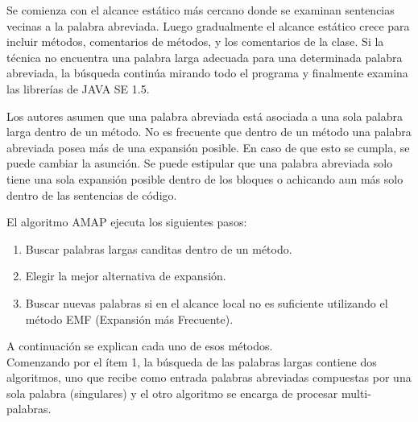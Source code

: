 \documentclass[a4paper,12pt]{report}
\begin{document}
Se comienza con el alcance estático más cercano donde se examinan sentencias vecinas a la palabra abreviada. Luego gradualmente el alcance estático crece para incluir métodos, comentarios de métodos, y los comentarios de la clase. Si la técnica no encuentra una palabra larga adecuada para una determinada palabra abreviada, la búsqueda continúa mirando todo el programa y finalmente examina las librerías de JAVA SE 1.5. 

Los autores asumen que una palabra abreviada está asociada a una sola palabra larga dentro de un método. No es frecuente que dentro de un método una palabra abreviada posea más de una expansión posible. En caso de que esto se cumpla, se puede cambiar la asunción. Se puede estipular que una palabra abreviada solo tiene una sola expansión posible dentro de los bloques o achicando aun más solo dentro de las sentencias de código.


El algoritmo AMAP ejecuta los siguientes pasos:

\begin{enumerate}
\itemsep0em%
\item Buscar palabras largas canditas dentro de un método.
\item Elegir la mejor alternativa de expansión.
\item Buscar nuevas palabras si en el alcance local no es suficiente utilizando el método EMF (Expansión más Frecuente).
\end{enumerate}

A continuación se explican cada uno de esos métodos.\\

Comenzando por el ítem 1, la búsqueda de las palabras largas contiene dos algoritmos, uno que recibe como entrada palabras abreviadas compuestas por una sola palabra (singulares) y el otro algoritmo se encarga de procesar multi-palabras.\\
\end{document}
